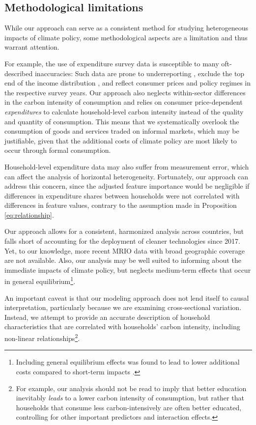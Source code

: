 \documentclass[12pt, a4paper]{article}
\begin{document}
\subsection{Methodological limitations}

While our approach can serve as a consistent method for studying heterogeneous impacts of climate policy, some methodological aspects are a limitation and thus warrant attention.

For example, the use of expenditure survey data is susceptible to many oft-described inaccuracies: Such data are prone to underreporting \autocite{Meyer.2015}, exclude the top end of the income distribution \autocite{Blanchet.2022}, and reflect consumer prices and policy regimes in the respective survey years. Our approach also neglects within-sector differences in the carbon intensity of consumption and relies on consumer price-dependent \textit{expenditures} to calculate household-level carbon intensity instead of the quality and quantity of consumption. This means that we systematically overlook the consumption of goods and services traded on informal markets, which may be justifiable, given that the additional costs of climate policy are most likely to occur through formal consumption.

Household-level expenditure data may also suffer from measurement error, which can affect the analysis of horizontal heterogeneity. Fortunately, our approach can address this concern, since the adjusted feature importance would be negligible if differences in expenditure shares between households were not correlated with differences in feature values, contrary to the assumption made in Proposition \ref{eq:relationship}.

Our approach allows for a consistent, harmonized analysis across countries, but falls short of accounting for the deployment of cleaner technologies since 2017. Yet, to our knowledge, more recent MRIO data with broad geographic coverage are not available. Also, our analysis may be well suited to informing about the immediate impacts of climate policy, but neglects medium-term effects that occur in general equilibrium\footnote{Including general equilibrium effects was found to lead to lower additional costs compared to short-term impacts \autocite{Ohlendorf.2021}.}. 

An important caveat is that our modeling approach does not lend itself to causal interpretation, particularly  because we are examining cross-sectional variation. Instead, we attempt to provide an accurate description of household characteristics that are correlated with households' carbon intensity, including non-linear relationships\footnote{For example, our analysis should not be read to imply that better education inevitably \textit{leads} to a lower carbon intensity of consumption, but rather that households that consume less carbon-intensively are often better educated, controlling for other important predictors and interaction effects.}.
\end{document}
